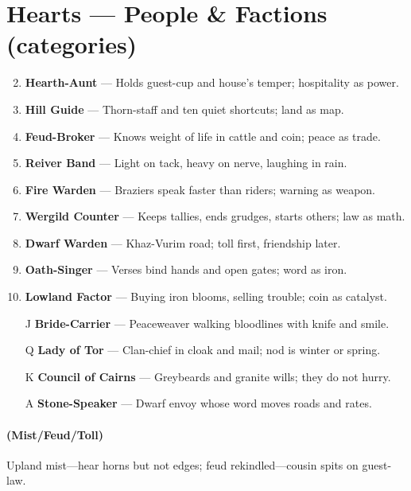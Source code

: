 \section*{Hearts --- People \& Factions (categories)}
\label{sec:ubral-people}
\begin{enumerate}
\setcounter{enumi}{1}
\item \textbf{Hearth-Aunt} --- Holds guest-cup and house's temper; hospitality as power.
\item \textbf{Hill Guide} --- Thorn-staff and ten quiet shortcuts; land as map.
\item \textbf{Feud-Broker} --- Knows weight of life in cattle and coin; peace as trade.
\item \textbf{Reiver Band} --- Light on tack, heavy on nerve, laughing in rain.
\item \textbf{Fire Warden} --- Braziers speak faster than riders; warning as weapon.
\item \textbf{Wergild Counter} --- Keeps tallies, ends grudges, starts others; law as math.
\item \textbf{Dwarf Warden} --- Khaz-Vurim road; toll first, friendship later.
\item \textbf{Oath-Singer} --- Verses bind hands and open gates; word as iron.
\item \textbf{Lowland Factor} --- Buying iron blooms, selling trouble; coin as catalyst.
\item[J] \textbf{Bride-Carrier} --- Peaceweaver walking bloodlines with knife and smile.
\item[Q] \textbf{Lady of Tor} --- Clan-chief in cloak and mail; nod is winter or spring.
\item[K] \textbf{Council of Cairns} --- Greybeards and granite wills; they do not hurry.
\item[A] \textbf{Stone-Speaker} --- Dwarf envoy whose word moves roads and rates.
\end{enumerate}

\paragraph*{(Mist/Feud/Toll)} Upland mist---hear horns but not edges; feud rekindled---cousin spits on guest-law.

